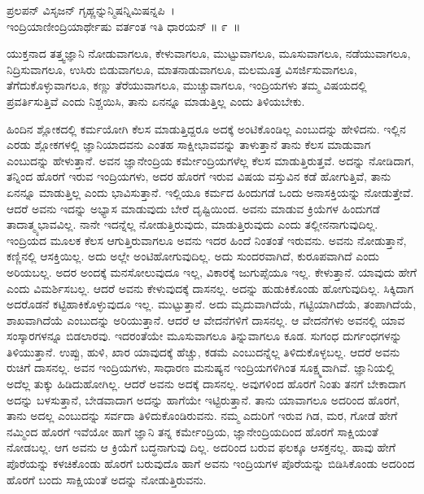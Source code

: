 \begin{shloka}
ಪ್ರಲಪನ್ ವಿಸೃಜನ್ ಗೃಹ್ಣನ್ನುನ್ಮಿಷನ್ನಿಮಿಷನ್ನಪಿ~।\\ಇಂದ್ರಿಯಾಣೀಂದ್ರಿಯಾರ್ಥೇಷು ವರ್ತಂತ ಇತಿ ಧಾರಯನ್ \hfill॥ ೯~॥
\end{shloka}

\begin{artha}
ಯುಕ್ತನಾದ ತತ್ತ್ವಜ್ಞಾನಿ ನೋಡುವಾಗಲೂ, ಕೇಳುವಾಗಲೂ, ಮುಟ್ಟುವಾಗಲೂ, ಮೂಸುವಾಗಲೂ, ನಡೆಯುವಾಗಲೂ, ನಿದ್ರಿಸುವಾಗಲೂ, ಉಸಿರು ಬಿಡುವಾಗಲೂ, ಮಾತನಾಡುವಾಗಲೂ, ಮಲ\-ಮೂತ್ರ ವಿಸರ್ಜಿಸುವಾಗಲೂ, ತೆಗೆದುಕೊಳ್ಳುವಾಗಲೂ, ಕಣ್ಣು ತೆರೆಯುವಾಗಲೂ, ಮುಚ್ಚು\-ವಾಗಲೂ, ಇಂದ್ರಿಯಗಳು ತಮ್ಮ ವಿಷಯದಲ್ಲಿ ಪ್ರವರ್ತಿಸುತ್ತಿವೆ ಎಂದು ನಿಶ್ಚಯಿಸಿ, ತಾನು ಏನನ್ನೂ ಮಾಡುತ್ತಿಲ್ಲ ಎಂದು ತಿಳಿಯಬೇಕು.
\end{artha}

ಹಿಂದಿನ ಶ್ಲೋಕದಲ್ಲಿ ಕರ್ಮಯೋಗಿ ಕೆಲಸ ಮಾಡುತ್ತಿದ್ದರೂ ಅದಕ್ಕೆ ಅಂಟಿಕೊಂಡಿಲ್ಲ ಎಂಬು\-ದನ್ನು ಹೇಳಿದನು. ಇಲ್ಲಿನ ಎರಡು ಶ್ಲೋಕಗಳಲ್ಲಿ ಜ್ಞಾನಿಯಾದವನು ಎಂತಹ ಸಾಕ್ಷೀಭಾವವನ್ನು ತಾಳುತ್ತಾನೆ ತಾನು ಕೆಲಸ ಮಾಡುವಾಗ ಎಂಬುದನ್ನು ಹೇಳುತ್ತಾನೆ. ಅವನ ಜ್ಞಾನೇಂದ್ರಿಯ ಕರ್ಮೇಂದ್ರಿಯಗಳೆಲ್ಲ ಕೆಲಸ ಮಾಡುತ್ತಿರುತ್ತವೆ. ಅದನ್ನು ನೋಡಿದಾಗ, ತನ್ನಿಂದ ಹೊರಗೆ ಇರುವ ಇಂದ್ರಿಯಗಳು, ಅದರ ಹೊರಗೆ ಇರುವ ವಿಷಯ ವಸ್ತುವಿನ ಕಡೆ ಹೋಗುತ್ತಿವೆ, ತಾನು ಏನನ್ನೂ ಮಾಡುತ್ತಿಲ್ಲ ಎಂದು ಭಾವಿಸುತ್ತಾನೆ. ಇಲ್ಲಿಯೂ ಕರ್ಮದ ಹಿಂದುಗಡೆ ಒಂದು ಅನಾಸಕ್ತಿಯನ್ನು ನೋಡುತ್ತೇವೆ. ಆದರೆ ಅವನು ಇದನ್ನು ಅಭ್ಯಾಸ ಮಾಡುವುದು ಬೇರೆ ದೃಷ್ಟಿಯಿಂದ. ಅವನು ಮಾಡುವ ಕ್ರಿಯೆಗಳ ಹಿಂದುಗಡೆ ತಾದಾತ್ಮ್ಯಭಾವವಿಲ್ಲ. ನಾನೇ ಇದನ್ನೆಲ್ಲ ನೋಡುತ್ತಿರುವುದು, ಮಾಡುತ್ತಿರುವುದು ಎಂದು ತಲ್ಲೀನನಾಗುವುದಿಲ್ಲ. ಇಂದ್ರಿಯದ ಮೂಲಕ ಕೆಲಸ ಆಗುತ್ತಿರುವಾಗಲೂ ಅವನು ಇದರ ಹಿಂದೆ ನಿಂತಂತೆ ಇರುವನು. ಅವನು ನೋಡುತ್ತಾನೆ, ಕಣ್ಣಿನಲ್ಲಿ ಆಸಕ್ತಿಯಿಲ್ಲ. ಅದು ಅಲ್ಲೇ ಅಂಟಿಹೋಗುವುದಿಲ್ಲ. ಅದು ಸುಂದರವಾಗಿದೆ, ಕುರೂಪವಾಗಿದೆ ಎಂದು ಅರಿಯಬಲ್ಲ. ಅದರ ಅಂದಕ್ಕೆ ಮನಸೋಲುವುದೂ ಇಲ್ಲ, ವಿಕಾರಕ್ಕೆ ಜುಗುಪ್ಸೆಯೂ ಇಲ್ಲ. ಕೇಳುತ್ತಾನೆ. ಯಾವುದು ಹೇಗೆ ಎಂದು ವಿಮರ್ಶಿಸಬಲ್ಲ. ಆದರೆ ಅವನು ಕೇಳುವುದಕ್ಕೆ ದಾಸನಲ್ಲ. ಅದನ್ನು ಹುಡುಕಿಕೊಂಡು ಹೋಗುವುದಿಲ್ಲ. ಸಿಕ್ಕಿದಾಗ ಅದರೊಡನೆ ಕಟ್ಟಿಹಾಕಿಕೊಳ್ಳುವುದೂ ಇಲ್ಲ. ಮುಟ್ಟುತ್ತಾನೆ. ಅದು ಮೃದುವಾಗಿದೆಯೆ, ಗಟ್ಟಿಯಾಗಿದೆಯೆ, ತಂಪಾಗಿದೆಯೆ, ಶಾಖವಾಗಿದೆಯೆ ಎಂಬುದನ್ನು ಅರಿಯುತ್ತಾನೆ. ಆದರೆ ಆ ವೇದನೆಗಳಿಗೆ ದಾಸನಲ್ಲ. ಆ ವೇದನೆಗಳು ಅವನಲ್ಲಿ ಯಾವ ಸಂಸ್ಕಾರಗಳನ್ನೂ ಬಿಡಲಾರವು. ಇದರಂತೆಯೇ ಮೂಸುವಾಗಲೂ ತಿನ್ನುವಾಗಲೂ ಕೂಡ. ಸುಗಂಧ ದುರ್ಗಂಧಗಳನ್ನು ತಿಳಿಯುತ್ತಾನೆ. ಉಪ್ಪು, ಹುಳಿ, ಖಾರ ಯಾವುದಕ್ಕೆ ಹೆಚ್ಚು, ಕಡಮೆ ಎಂಬುದನ್ನೆಲ್ಲ ತಿಳಿದುಕೊಳ್ಳಬಲ್ಲ. ಆದರೆ ಅವನು ರುಚಿಗೆ ದಾಸನಲ್ಲ. ಅವನ ಇಂದ್ರಿಯಗಳು, ಸಾಧಾರಣ ಮನುಷ್ಯನ ಇಂದ್ರಿಯಗಳಿಗಿಂತ ಸೂಕ್ಷ್ಮವಾಗಿವೆ. ಜ್ಞಾನಿಯಲ್ಲಿ ಅದೆಲ್ಲ ತುಕ್ಕು ಹಿಡಿದುಹೋಗಿಲ್ಲ. ಆದರೆ ಅವನು ಅದಕ್ಕೆ ದಾಸನಲ್ಲ. ಅವುಗಳಿಂದ ಹೊರಗೆ ನಿಂತು ತನಗೆ ಬೇಕಾದಾಗ ಅದನ್ನು ಬಳಸುತ್ತಾನೆ, ಬೇಡವಾದಾಗ ಅದನ್ನು ಹಾಗೆಯೇ ಇಟ್ಟಿರುತ್ತಾನೆ. ತಾನು ಯಾವಾಗಲೂ ಅದರಿಂದ ಹೊರಗೆ, ತಾನು ಅದಲ್ಲ ಎಂಬುದನ್ನು ಸರ್ವದಾ ತಿಳಿದುಕೊಂಡಿರುವನು. ನಮ್ಮ ಎದುರಿಗೆ ಇರುವ ಗಿಡ, ಮರ, ಗೋಡೆ ಹೇಗೆ ನಮ್ಮಿಂದ ಹೊರಗೆ ಇವೆಯೋ ಹಾಗೆ ಜ್ಞಾನಿ ತನ್ನ ಕರ್ಮೇಂದ್ರಿಯ, ಜ್ಞಾನೇಂದ್ರಿಯದಿಂದ ಹೊರಗೆ ಸಾಕ್ಷಿಯಂತೆ ನೋಡಬಲ್ಲ. ಆಗ ಅವನು ಆ ಕ್ರಿಯೆಗೆ ಬದ್ಧನಾಗುವು ದಿಲ್ಲ. ಅದರಿಂದ ಬರುವ ಫಲಕ್ಕೂ ಆಸಕ್ತನಲ್ಲ. ಹಾವು ಹೇಗೆ ಪೊರೆಯನ್ನು ಕಳಚಿಕೊಂಡು ಹೊರಗೆ ಬರುವುದೊ ಹಾಗೆ ಅವನು ಇಂದ್ರಿಯಗಳ ಪೊರೆಯನ್ನು ಬಿಡಿಸಿಕೊಂಡು ಅದರಿಂದ ಹೊರಗೆ ಬಂದು ಸಾಕ್ಷಿಯಂತೆ ಅದನ್ನು ನೋಡುತ್ತಿರುವನು.

